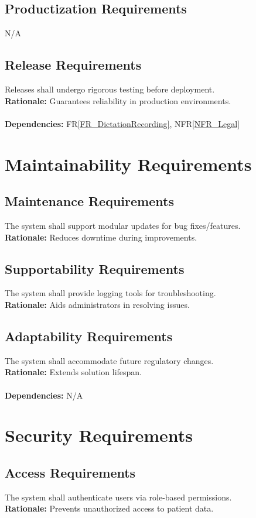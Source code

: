 \documentclass[12pt]{article}
\begin{document}
\begin{itemize}
\subsection{Productization Requirements}
N/A

\subsection{Release Requirements}
Releases shall undergo rigorous testing before deployment.  \\
\textbf{Rationale:} Guarantees reliability in production environments. \\
  \\
\textbf{Dependencies:} FR\ref{FR_DictationRecording}, NFR\ref{NFR_Legal}

\section{Maintainability Requirements} \label{NFR_Maintainability}
\subsection{Maintenance Requirements}
The system shall support modular updates for bug fixes/features.  \\
\textbf{Rationale:} Reduces downtime during improvements.

\subsection{Supportability Requirements}
The system shall provide logging tools for troubleshooting.  \\
\textbf{Rationale:} Aids administrators in resolving issues.

\subsection{Adaptability Requirements}
The system shall accommodate future regulatory changes.  \\
\textbf{Rationale:} Extends solution lifespan. \\
  \\
\textbf{Dependencies:} N/A

\section{Security Requirements} \label{NFR_Security}
\subsection{Access Requirements}
The system shall authenticate users via role-based permissions.  \\
\textbf{Rationale:} Prevents unauthorized access to patient data.


\end{itemize}
\end{document}
